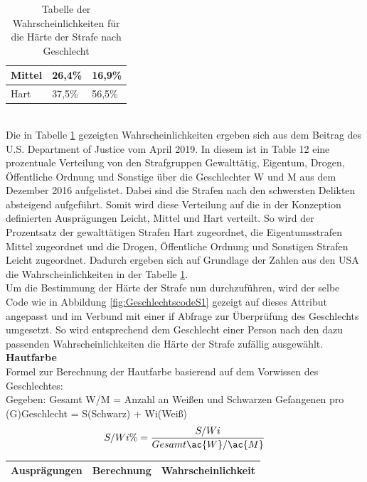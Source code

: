 \begin{onehalfspace}
\begin{table}[h]
\begin{tabular}{|l|l|l|}
    Mittel                & 26,4\%            & 16,9\%            \\ \hline
    Hart                  & 37,5\%            & 56,5\%            \\ \hline
    \end{tabular}
\caption{Tabelle der Wahrscheinlichkeiten für die Härte der Strafe nach Geschlecht}
\label{table:4}
\end{table}\\
Die in Tabelle \ref{table:4} gezeigten Wahrscheinlichkeiten ergeben sich aus dem Beitrag des U.S. Department of Justice vom April 2019. In diesem ist in \glqq{}Table 12\grqq{} eine prozentuale Verteilung von den Strafgruppen Gewalttätig, Eigentum, Drogen, Öffentliche Ordnung und Sonstige über die Geschlechter \ac{W} und \ac{M} aus dem Dezember 2016 aufgelistet. Dabei sind die Strafen nach den schwersten Delikten absteigend aufgeführt. Somit wird diese Verteilung auf die in der Konzeption definierten Ausprägungen Leicht, Mittel und Hart verteilt. So wird der Prozentsatz der gewalttätigen Strafen Hart zugeordnet, die Eigentumsstrafen Mittel zugeordnet und die Drogen, Öffentliche Ordnung und Sonstigen Strafen Leicht zugeordnet. Dadurch ergeben sich auf Grundlage der Zahlen aus den USA die Wahrscheinlichkeiten in der Tabelle \ref{table:4}.\cite[S. 21]{Bronson2017}\\
Um die Bestimmung der Härte der Strafe nun durchzuführen, wird der selbe Code wie in Abbildung \ref{fig:GeschlechtscodeS1} gezeigt auf dieses Attribut angepasst und im Verbund mit einer if Abfrage zur Überprüfung des Geschlechts umgesetzt. So wird entsprechend dem Geschlecht einer Person nach den dazu passenden Wahrscheinlichkeiten die Härte der Strafe zufällig ausgewählt.\\
\textbf{Hautfarbe}\\
Formel zur Berechnung der Hautfarbe basierend auf dem Vorwissen des Geschlechtes:\\
Gegeben: Gesamt \ac{W}/\ac{M} = Anzahl an Weißen und Schwarzen Gefangenen pro (G)Geschlecht = S(Schwarz) + Wi(Weiß)\\
\begin{equation}
    S/Wi\% = \frac{S/Wi}{Gesamt \ac{W}/\ac{M}}\label{eq:Sz1Hautfarbe}
\end{equation}
\begin{table}[h]
    \centering
    \begin{tabular}{|c|c|c|}
    \hline
    \textbf{Ausprägungen} & \textbf{Berechnung} & \textbf{Wahrscheinlichkeit} \\ \hline

\end{tabular}
\end{table}
\end{onehalfspace}
